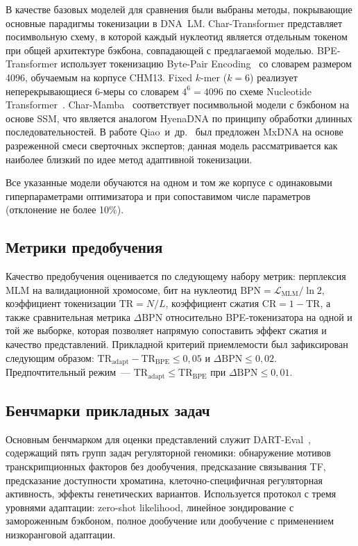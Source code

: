 В качестве базовых моделей для сравнения были выбраны методы,
покрывающие основные парадигмы токенизации в DNA~LM. Char-Transformer
представляет посимвольную схему, в которой каждый нуклеотид является
отдельным токеном при общей архитектуре бэкбона, совпадающей с
предлагаемой моделью. BPE-Transformer использует токенизацию Byte-Pair
Encoding~\cite{sennrichNeuralMachineTranslation2016} со словарем
размером 4096, обучаемым на корпусе CHM13. Fixed $k$-mer ($k = 6$)
реализует неперекрывающиеся 6-меры со словарем $4^6 = 4096$ по схеме
Nucleotide Transformer~\cite{dalla-torreNucleotideTransformerBuilding2025}.
Char-Mamba~\cite{guMambaLinearTimeSequence2023} соответствует
посимвольной модели с бэкбоном на основе SSM, что является аналогом
HyenaDNA по принципу обработки длинных последовательностей. В работе
Qiao~и~др.~\cite{qiaoMxDNAAdaptiveDNA2024} был предложен MxDNA на
основе разреженной смеси сверточных экспертов; данная модель
рассматривается как наиболее близкий по идее метод адаптивной
токенизации.

Все указанные модели обучаются на одном и том же корпусе с одинаковыми
гиперпараметрами оптимизатора и при сопоставимом числе параметров
(отклонение не более 10\%).

\subsection{Метрики предобучения}

Качество предобучения оценивается по следующему набору метрик:
перплексия MLM на валидационной хромосоме, бит на нуклеотид
$\text{BPN} = \mathcal L_{\text{MLM}} / \ln 2$, коэффициент токенизации
$\text{TR} = N / L$, коэффициент сжатия $\text{CR} = 1 - \text{TR}$,
а также сравнительная метрика $\Delta \text{BPN}$ относительно
BPE-токенизатора на одной и той же выборке, которая позволяет напрямую
сопоставить эффект сжатия и качество представлений. Прикладной
критерий приемлемости был зафиксирован следующим образом:
$\text{TR}_{\text{adapt}} - \text{TR}_{\text{BPE}} \leq 0{,}05$ и
$\Delta \text{BPN} \leq 0{,}02$. Предпочтительный режим~---
$\text{TR}_{\text{adapt}} \leq \text{TR}_{\text{BPE}}$ при $\Delta
\text{BPN} \leq 0{,}01$.

\subsection{Бенчмарки прикладных задач}

Основным бенчмарком для оценки представлений служит
DART-Eval~\cite{patel2025dartevalcomprehensivednalanguage}, содержащий
пять групп задач регуляторной геномики: обнаружение мотивов
транскрипционных факторов без дообучения, предсказание связывания TF,
предсказание доступности хроматина, клеточно-специфичная регуляторная
активность, эффекты генетических вариантов. Используется протокол с
тремя уровнями адаптации: zero-shot likelihood, линейное зондирование
с замороженным бэкбоном, полное дообучение или дообучение с
применением низкоранговой адаптации.

